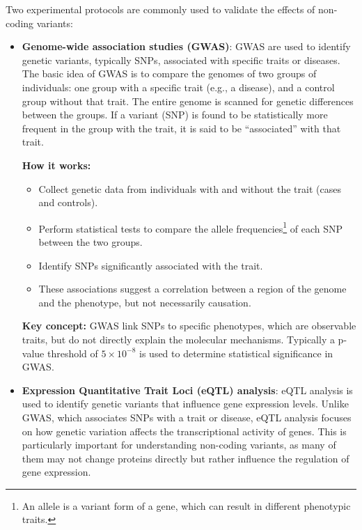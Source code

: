 \documentclass[a4paper]{article}
\begin{document}
Two experimental protocols are commonly used to validate the effects of non-coding
variants:

\begin{itemize}
    \item \textbf{Genome-wide association studies (GWAS)}: GWAS are used to identify
    genetic variants, typically SNPs, associated with
    specific traits or diseases. The basic idea of GWAS is to compare the genomes of two
    groups of individuals: one group with a specific trait (e.g., a disease), and a control
    group without that trait. The entire genome is scanned for genetic differences between
    the groups. If a variant (SNP) is found to be statistically more frequent in the group
    with the trait, it is said to be ``associated'' with that trait. 

    \textbf{How it works:}
    \begin{itemize}
        \item Collect genetic data from individuals with and without the trait 
        (cases and controls).
        \item Perform statistical tests to compare the allele frequencies\footnote{
        An allele is a variant form of a gene, which can result in different
        phenotypic traits.} 
        of each SNP between the two groups.
        \item Identify SNPs significantly associated with the trait.
        \item These associations suggest a correlation between a region of the 
        genome and the phenotype, but not necessarily causation.
    \end{itemize}

    \textbf{Key concept:} GWAS link SNPs to specific phenotypes, which are 
    observable traits, but do not directly explain the molecular mechanisms.
    Typically a p-value threshold of $5 \times 10^{-8}$ is used to determine
    statistical significance in GWAS.

    \item \textbf{Expression Quantitative Trait Loci (eQTL) analysis}: eQTL analysis is used to
    identify genetic variants that influence gene expression levels. Unlike GWAS, which associates
    SNPs with a trait or disease, eQTL analysis focuses on how genetic variation affects the
    transcriptional activity of genes. This is particularly important for understanding non-coding
    variants, as many of them may not change proteins directly but rather influence the regulation
    of gene expression.


\end{itemize}
\end{document}
